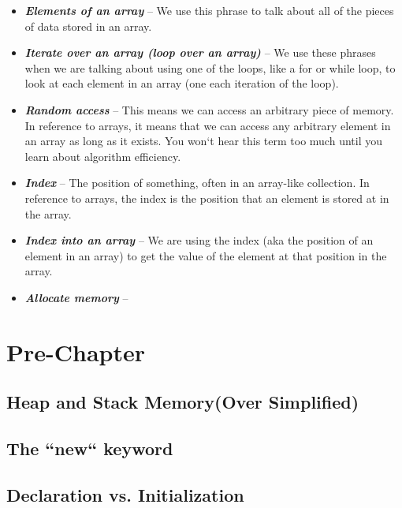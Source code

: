 \documentclass[11]{article}
\begin{document}
\begin{itemize}
  \item \textbf{\textit{Elements of an array}} -- We use this phrase to talk about all of the pieces of data stored in an array.
  
  \item \textbf{\textit{Iterate over an array (loop over an array)}} -- We use these phrases when we are talking about using one of the loops, like a for or while loop, to look at each element in an array (one each iteration of the loop).
  
  \item \textbf{\textit{Random access}} -- This means we can access an arbitrary piece of memory. In reference to arrays, it means that we can access any arbitrary element in an array as long as it exists. You won`t hear this term too much until you learn about algorithm efficiency.
  
  \item \textbf{\textit{Index}} -- The position of something, often in an array-like collection. In reference to arrays, the index is the position that an element is stored at in the array.
  
  \item \textbf{\textit{Index into an array}} -- We are using the index (aka the position of an element in an array) to get the value of the element at that position in the array.
  
  \item \textbf{\textit{Allocate memory}} --
  
\end{itemize}
\section{Pre-Chapter}
\subsection{Heap and Stack Memory(Over Simplified)}
\label{sec:heap}

\subsection{The ``new`` keyword}
\subsection{Declaration vs. Initialization}
\end{document}
